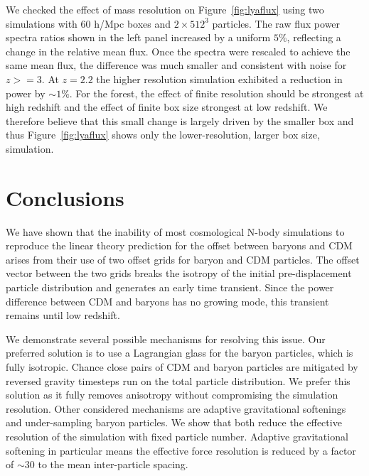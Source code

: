 \documentclass[a4paper,11pt]{article}
\begin{document}
We checked the effect of mass resolution on Figure~\ref{fig:lyaflux} using two simulations with $60$ h/Mpc boxes and $2\times 512^3$ particles. The raw flux power spectra ratios shown in the left panel increased by a uniform $5\%$, reflecting a change in the relative mean flux. Once the spectra were rescaled to achieve the same mean flux, the difference was much smaller and consistent with noise for $z >= 3$. At $z=2.2$ the higher resolution simulation exhibited a reduction in power by $\sim 1\%$. For the forest, the effect of finite resolution should be strongest at high redshift \cite{Bolton:2009} and the effect of finite box size strongest at low redshift. We therefore believe that this small change is largely driven by the smaller box and thus Figure~\ref{fig:lyaflux} shows only the lower-resolution, larger box size, simulation.

\section{Conclusions}
\label{sec:conclude}

We have shown that the inability of most cosmological N-body simulations to reproduce the linear theory prediction for the offset between baryons and CDM arises from their use of two offset grids for baryon and CDM particles. The offset vector between the two grids breaks the isotropy of the initial pre-displacement particle distribution and generates an early time transient. Since the power difference between CDM and baryons has no growing mode, this transient remains until low redshift.

We demonstrate several possible mechanisms for resolving this issue. Our preferred solution is to use a Lagrangian glass for the baryon particles, which is fully isotropic. Chance close pairs of CDM and baryon particles are mitigated by reversed gravity timesteps run on the total particle distribution. We prefer this solution as it fully removes anisotropy without compromising the simulation resolution. Other considered mechanisms are adaptive gravitational softenings and under-sampling baryon particles. We show that both reduce the effective resolution of the simulation with fixed particle number. Adaptive gravitational softening in particular means the effective force resolution is reduced by a factor of $\sim 30$ to the mean inter-particle spacing.
\end{document}
